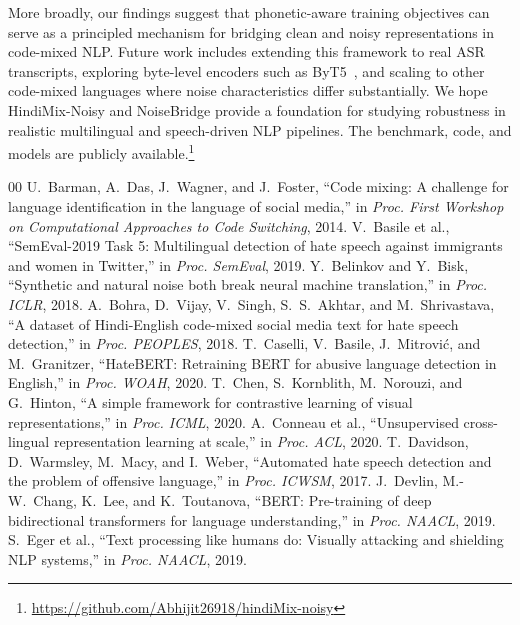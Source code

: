 \documentclass[conference]{IEEEtran}
\begin{document}
More broadly, our findings suggest that phonetic-aware training objectives can serve as a principled mechanism for bridging clean and noisy representations in code-mixed NLP. Future work includes extending this framework to real ASR transcripts, exploring byte-level encoders such as ByT5~\cite{xue2022byt5}, and scaling to other code-mixed languages where noise characteristics differ substantially. We hope HindiMix-Noisy and NoiseBridge provide a foundation for studying robustness in realistic multilingual and speech-driven NLP pipelines. The benchmark, code, and models are publicly available.\footnote{\url{https://github.com/Abhijit26918/hindiMix-noisy}}

\begin{thebibliography}{00}
 U.~Barman, A.~Das, J.~Wagner, and J.~Foster, ``Code mixing: A challenge for language identification in the language of social media,'' in \textit{Proc. First Workshop on Computational Approaches to Code Switching}, 2014.
 V.~Basile et al., ``SemEval-2019 Task 5: Multilingual detection of hate speech against immigrants and women in Twitter,'' in \textit{Proc. SemEval}, 2019.
 Y.~Belinkov and Y.~Bisk, ``Synthetic and natural noise both break neural machine translation,'' in \textit{Proc. ICLR}, 2018.
 A.~Bohra, D.~Vijay, V.~Singh, S.~S.~Akhtar, and M.~Shrivastava, ``A dataset of Hindi-English code-mixed social media text for hate speech detection,'' in \textit{Proc. PEOPLES}, 2018.
 T.~Caselli, V.~Basile, J.~Mitrovi{\'c}, and M.~Granitzer, ``HateBERT: Retraining BERT for abusive language detection in English,'' in \textit{Proc. WOAH}, 2020.
 T.~Chen, S.~Kornblith, M.~Norouzi, and G.~Hinton, ``A simple framework for contrastive learning of visual representations,'' in \textit{Proc. ICML}, 2020.
 A.~Conneau et al., ``Unsupervised cross-lingual representation learning at scale,'' in \textit{Proc. ACL}, 2020.
 T.~Davidson, D.~Warmsley, M.~Macy, and I.~Weber, ``Automated hate speech detection and the problem of offensive language,'' in \textit{Proc. ICWSM}, 2017.
 J.~Devlin, M.-W.~Chang, K.~Lee, and K.~Toutanova, ``BERT: Pre-training of deep bidirectional transformers for language understanding,'' in \textit{Proc. NAACL}, 2019.
 S.~Eger et al., ``Text processing like humans do: Visually attacking and shielding NLP systems,'' in \textit{Proc. NAACL}, 2019.

\end{thebibliography}
\end{document}
